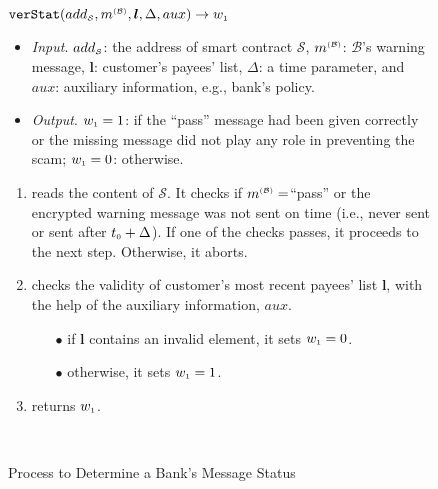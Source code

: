 \begin{figure}[!htbp]
\setlength{\fboxsep}{0.7pt}
\begin{center}
\begin{boxedminipage}{12.3cm}
\small{
\underline{$\mathtt{verStat}(add_{\scriptscriptstyle\mathcal{S}}, m^{\scriptscriptstyle\mathcal{(B)}},  \bm l, \Delta, aux)\rightarrow w_{\scriptscriptstyle 1}$}\\
%
\begin{itemize}
\item\noindent\textit{Input}. $add_{\scriptscriptstyle\mathcal{S}}$: the address of smart contract $\mathcal{S}$, $m^{\scriptscriptstyle\mathcal{(B)}}$:  $\mathcal{B}$'s warning message,  $\bm l$:  customer's payees' list, $\Delta$: a time parameter, and $aux$: auxiliary information, e.g., bank's policy. 
%
\item\noindent\textit{Output}. $ w_{\scriptscriptstyle 1}=1$: if the ``pass'' message had been given correctly or the missing message did not play any role in preventing the scam; $ w_{\scriptscriptstyle 1}=0$: otherwise. 
\end{itemize}
\begin{enumerate}
\item reads the content of   $\mathcal{S}$. It checks if $m^{\scriptscriptstyle\mathcal{(B)}}=$``pass''  or the encrypted warning message was not sent on time (i.e., never sent or sent after    $t_{\scriptscriptstyle 0}+\Delta$).  If one of the checks passes, it proceeds to the next step. Otherwise, it aborts. 
\item checks the validity of  customer's most recent payees' list $\bm l$, with the help of the auxiliary information, $aux$. 
\begin{itemize}
\item[$\bullet$]  if $\bm l$ contains an invalid element,  it sets $ w_{\scriptscriptstyle 1}=0$.
\item [$\bullet$] otherwise, it sets $ w_{\scriptscriptstyle 1}=1$.
\end{itemize}
\item returns $ w_{\scriptscriptstyle 1}$.

\

\end{enumerate}

}
\end{boxedminipage}
\end{center}
\caption{Process to Determine a Bank's Message Status} 
\label{fig:verStat}
\end{figure}
